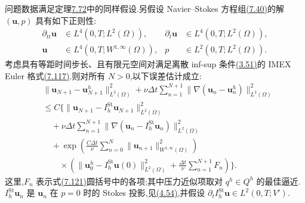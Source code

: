 \begin{theorem}
\label{thm:imex-euler-fem-velocity-error}
问题数据满足定理\hyperref[thm:fully-discrete-backward-euler-velocity-error]{7.72}中的同样假设.另假设 Navier--Stokes 方程组\hyperref[eq:time-dependent-ns-weak-first]{(7.40)}的解 $(\bm{u},p)$ 具有如下正则性:
\begin{equation}\label{eq:imex-euler-error-regularity}
\begin{aligned}
 \partial_{tt}\bm{u}&\in L^4(0,T;L^2(\Omega)),&
 \partial_t\bm{u}&\in L^4(0,T;L^2(\Omega)),\\
 \bm{u}&\in L^4(0,T;W^{1,\infty}(\Omega)),&
 p&\in L^2(0,T;L^2(\Omega)).
\end{aligned}
\end{equation}
考虑具有等距时间步长、且有限元空间对满足离散 inf-sup 条件\hyperref[eq:discrete-infsup-condition]{(3.51)}的 IMEX Euler 格式\hyperref[eq:imex-euler-fully-discrete-scheme]{(7.117)}.则对所有 $N>0$,以下误差估计成立:
\begin{equation}\label{eq:imex-euler-velocity-error}
\begin{aligned}
 &\|\bm{u}_{N+1}-\bm{u}_{N+1}^h\|_{L^2(\Omega)}^2
   +\nu\Delta t\sum_{n=1}^{N+1}
      \|\nabla(\bm{u}_n-\bm{u}_n^h)\|_{L^2(\Omega)}^2\\
 &\le C\Biggl\{
      \|\bm{u}_{N+1}-I_h^{\mathrm{St}}\bm{u}_{N+1}\|_{L^2(\Omega)}^2\\
 &\quad+\nu\Delta t\sum_{n=1}^{N+1}
        \|\nabla(\bm{u}_n-I_h^{\mathrm{St}}\bm{u}_n)\|_{L^2(\Omega)}^2\\
 &\quad+\exp\!\left(
       \frac{C\Delta t}{\nu}\sum_{n=0}^{N}
          \|\bm{u}_{n+1}\|_{W^{1,\infty}(\Omega)}^2\right)\\
 &\qquad\times\left(
       \|\bm{u}_0^h-I_h^{\mathrm{St}}\bm{u}(0)\|_{L^2(\Omega)}^2
       +\frac{\Delta t}{\nu}\sum_{n=1}^{N+1}F_n\right)
   \Biggr\}.
\end{aligned}
\end{equation}
这里,$F_n$ 表示式\hyperref[eq:imex-euler-error-energy-estimate]{(7.121)}圆括号中的各项;其中压力近似项取对 $q^h\in Q^h$ 的最佳逼近.$I_h^{\mathrm{St}}\bm{u}_n$ 是 $\bm{u}_n$ 在 $p=0$ 时的 Stokes 投影,见\hyperref[eq:stokes-projection-definition]{(4.54)},并假设 $\partial_t I_h^{\mathrm{St}}\bm{u}\in L^2(0,T;V')$.
\end{theorem}

